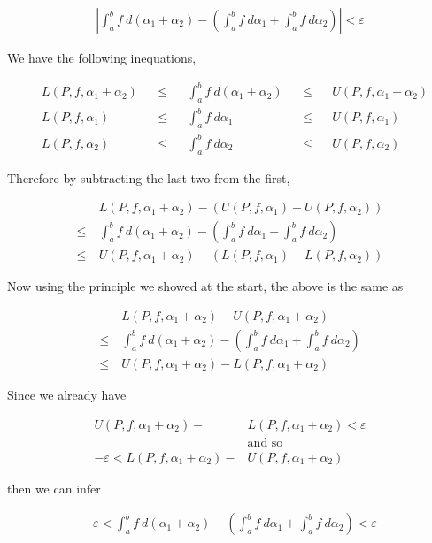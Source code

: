 \documentclass{article}
\begin{document}
  \begin{align*}
    \left|\int_a^b f\ d(\alpha_1+\alpha_2) - \left(\int_a^b f \ d\alpha_1+\int_a^b f \ d\alpha_2\right)\right| <\varepsilon
  \end{align*}

  We have the following inequations,

  \begin{align*}
    &L(P, f, \alpha_1+\alpha_2) &&\leq &&\int_a^b f \ d(\alpha_1+\alpha_2) &&\leq &&U(P,f,\alpha_1+\alpha_2)\\
    &L(P, f, \alpha_1) &&\leq &&\int_a^b f \ d\alpha_1 &&\leq &&U(P,f,\alpha_1)\\
    &L(P, f, \alpha_2) &&\leq &&\int_a^b f \ d\alpha_2 &&\leq &&U(P,f,\alpha_2)
  \end{align*}

  Therefore by subtracting the last two from the first,

  \begin{align*}
    &L(P, f, \alpha_1+\alpha_2)-(U(P, f, \alpha_1)+U(P, f, \alpha_2))\\
    \leq \ &\int_a^b f\ d(\alpha_1+\alpha_2) - \left(\int_a^b f \ d\alpha_1+\int_a^b f \ d\alpha_2\right)\\
    \leq \ & U(P, f, \alpha_1+\alpha_2)-(L(P, f, \alpha_1)+L(P, f, \alpha_2))
  \end{align*}

  Now using the principle we showed at the start, the above is the same as

  \begin{align*}
    &L(P, f, \alpha_1+\alpha_2)-U(P, f, \alpha_1+ \alpha_2)\\
    \leq \ &\int_a^b f\ d(\alpha_1+\alpha_2) - \left(\int_a^b f \ d\alpha_1+\int_a^b f \ d\alpha_2\right)\\
    \leq \ & U(P, f, \alpha_1+\alpha_2)-L(P, f, \alpha_1+\alpha_2)
  \end{align*}

  Since we already have

  \begin{align*}
    U(P, f, \alpha_1+\alpha_2)-&L(P, f, \alpha_1+\alpha_2) < \varepsilon\\
    &\text{and so}\\
    -\varepsilon < L(P, f, \alpha_1+\alpha_2)-&U(P, f, \alpha_1+\alpha_2)
  \end{align*}

  then we can infer

  \begin{align*}
    -\varepsilon <  \int_a^b f\ d(\alpha_1+\alpha_2) - \left(\int_a^b f \ d\alpha_1+\int_a^b f \ d\alpha_2\right) < \varepsilon
  \end{align*}
\end{document}
